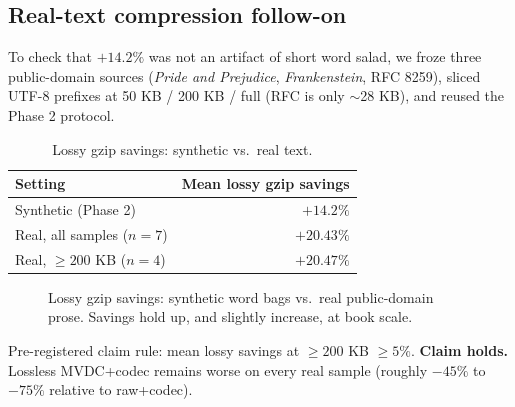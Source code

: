 \documentclass{article}
\begin{document}
\FloatBarrier
\subsection{Real-text compression follow-on}

To check that $+14.2\%$ was not an artifact of short word salad, we froze three public-domain sources (\emph{Pride and Prejudice}, \emph{Frankenstein}, RFC 8259), sliced UTF-8 prefixes at 50 KB / 200 KB / full (RFC is only $\sim$28 KB), and reused the Phase 2 protocol.

\begin{table}[h]
	\caption{Lossy gzip savings: synthetic vs.\ real text.}
	\centering
	\begin{tabular}{lr}
		\toprule
		Setting                    & Mean lossy gzip savings \\
		\midrule
		Synthetic (Phase 2)        & $+14.2\%$               \\
		Real, all samples ($n=7$)  & $\mathbf{+20.43\%}$     \\
		Real, $\geq 200$ KB ($n=4$)& $\mathbf{+20.47\%}$     \\
		\bottomrule
	\end{tabular}
	\label{tab:real-corpus}
\end{table}

\begin{figure}[ht]
	\centering
	\caption{Lossy gzip savings: synthetic word bags vs.\ real public-domain prose. Savings hold up, and slightly increase, at book scale.}
	\label{fig:real-vs-synth-bar}
\end{figure}

Pre-registered claim rule: mean lossy savings at $\geq 200$ KB $\geq 5\%$. \textbf{Claim holds.} Lossless MVDC+codec remains worse on every real sample (roughly $-45\%$ to $-75\%$ relative to raw+codec).
\end{document}
